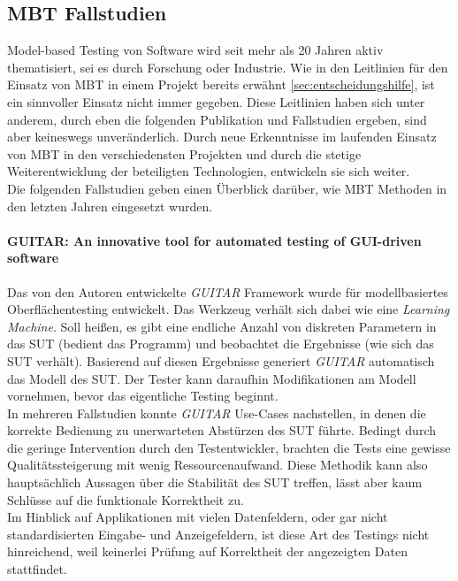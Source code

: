 \subsection{MBT Fallstudien}

Model-based Testing von Software wird seit mehr als 20 Jahren aktiv thematisiert, \cite{utting_practical_2007} sei es durch Forschung oder Industrie. Wie in den Leitlinien für den Einsatz von MBT in einem Projekt bereits erwähnt \ref{sec:entscheidungshilfe}, ist ein sinnvoller Einsatz nicht immer gegeben. Diese Leitlinien haben sich unter anderem, durch eben die folgenden Publikation und Fallstudien ergeben, sind aber keineswegs unveränderlich. Durch neue Erkenntnisse im laufenden Einsatz von MBT in den verschiedensten Projekten und durch die stetige Weiterentwicklung der beteiligten Technologien, entwickeln sie sich weiter.\\
Die folgenden Fallstudien geben einen Überblick darüber, wie MBT Methoden in den letzten Jahren eingesetzt wurden.

\paragraph{GUITAR: An innovative tool for automated testing of GUI-driven software \cite{nguyen_guitar:_2014}}Das von den Autoren entwickelte \textit{GUITAR} Framework wurde für modellbasiertes Oberflächentesting entwickelt. Das Werkzeug verhält sich dabei wie eine \textit{Learning Machine}. Soll heißen, es gibt eine endliche Anzahl von diskreten Parametern in das SUT (bedient das Programm) und beobachtet die Ergebnisse (wie sich das SUT verhält). Basierend auf diesen Ergebnisse generiert \textit{GUITAR} automatisch das Modell des SUT. Der Tester kann daraufhin Modifikationen am Modell vornehmen, bevor das eigentliche Testing beginnt.\\ 
In mehreren Fallstudien konnte \textit{GUITAR} Use-Cases nachstellen, in denen die korrekte Bedienung zu unerwarteten Abstürzen des SUT führte. Bedingt durch die geringe Intervention durch den Testentwickler, brachten die Tests eine gewisse Qualitätssteigerung mit wenig Ressourcenaufwand. Diese Methodik kann also hauptsächlich Aussagen über die Stabilität des SUT treffen, lässt aber kaum Schlüsse auf die funktionale Korrektheit zu.\\
Im Hinblick auf Applikationen mit vielen Datenfeldern, oder gar nicht standardisierten Eingabe- und Anzeigefeldern, ist diese Art des Testings nicht hinreichend, weil keinerlei Prüfung auf Korrektheit der angezeigten Daten stattfindet.

